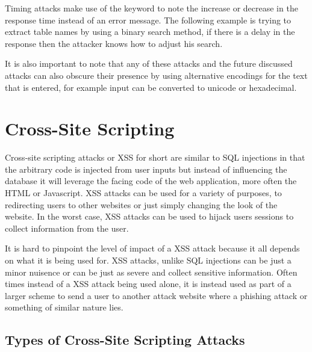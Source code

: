 
Timing attacks make use of the  keyword to note the increase or decrease in the response time instead of an error message.  The following example is trying to extract table names by using a binary search method, if there is a delay in the response then the attacker knows how to adjust his search.


It is also important to note that any of these attacks and the future discussed attacks can also obscure their presence by using alternative encodings for the text that is entered, for example input can be converted to unicode or hexadecimal.

\section{Cross-Site Scripting}

Cross-site scripting attacks or XSS for short are similar to SQL injections in that the arbitrary code is injected from user inputs but instead of influencing the database it will leverage the facing code of the web application, more often the HTML or Javascript.  XSS attacks can be used for a variety of purposes, to redirecting users to other websites or just simply changing the look of the website.  In the worst case, XSS attacks can be used to hijack users sessions to collect information from the user.

It is hard to pinpoint the level of impact of a XSS attack because it all depends on what it is being used for.  XSS attacks, unlike SQL injections can be just a minor nuisence or can be just as severe and collect sensitive information.  Often times instead of a XSS attack being used alone, it is instead used as part of a larger scheme to send a user to another attack website where a phishing attack or something of similar nature lies.

\subsection{Types of Cross-Site Scripting Attacks}

